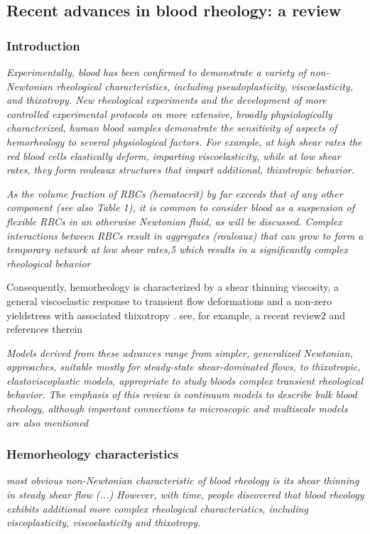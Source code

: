 \documentclass[11pt,letterpaper]{article}
\begin{document}
\newpage
\subsection{Recent advances in blood rheology: a review}

\subsubsection*{Introduction}
\textit{Experimentally, blood has been confirmed to demonstrate a variety of non-Newtonian rheological characteristics, including pseudoplasticity, viscoelasticity, and thixotropy. New rheological experiments and the development of more controlled experimental protocols on more extensive, broadly physiologically characterized, human blood samples demonstrate the sensitivity of aspects of hemorheology to several physiological factors. For example, at high shear rates the red blood cells elastically deform, imparting viscoelasticity, while at low shear rates, they form rouleaux structures that impart additional, thixotropic behavior.}

\textit{As the volume fraction of RBCs (hematocrit) by far exceeds that of any other component (see also Table 1), it is common to consider blood as a suspension of flexible RBCs in an otherwise Newtonian fluid, as will be discussed. Complex interactions between RBCs result in aggregates (rouleaux) that can grow to form a temporary network at low shear rates,5 which results in a significantly complex rheological behavior}


{\color{red} Consequently, hemorheology is characterized by a shear thinning viscosity, a general viscoelastic response to transient flow deformations and a non-zero yieldstress with associated
thixotropy . see, for example, a recent review2 and references therein}


\textit{Models derived from these advances range from simpler, generalized Newtonian, approaches, suitable mostly for steady-state shear-dominated flows, to thixotropic, elastoviscoplastic models, appropriate to study bloods complex transient rheological behavior. The emphasis of this review is continuum models to describe bulk blood rheology, although important connections to microscopic and multiscale models are also mentioned}

\subsubsection*{Hemorheology characteristics}
\textit{most obvious non-Newtonian characteristic of blood rheology is its shear thinning in steady shear flow (...) However, with time, people discovered that blood rheology exhibits additional more complex rheological characteristics, including viscoplasticity, viscoelasticity and thixotropy. }
\end{document}
